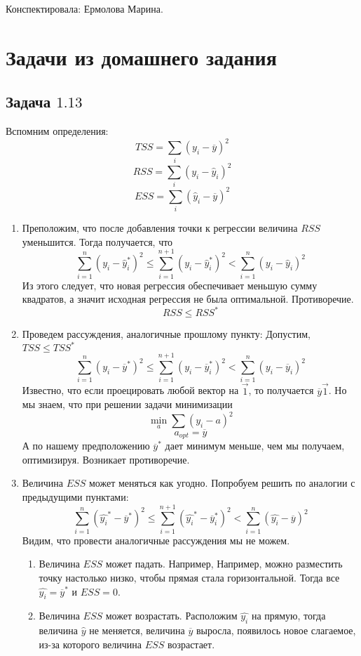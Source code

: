 \documentclass[12pt]{article} %
\theoremstyle{definition} %
\def \hy{\hat{y}}
\begin{document}
Конспектировала: Ермолова Марина.

\section{Задачи из домашнего задания}

\subsection{Задача \href{https://github.com/bdemeshev/metrics_pro/raw/master/metrics_pro.pdf}{$1.13$}}
Вспомним определения:
\[
TSS = \sum_i (y_i - \overline{y})^2
\]
\[
RSS = \sum_i (y_i - \hy_i)^2
\]
\[
ESS = \sum_i (\hy_i - \overline{y})^2
\]
\begin{enumerate}
\item
Преположим, что после добавления точки к регрессии величина $RSS$ уменьшится. Тогда получается, что \[\sum_{i=1}^n (y_i - \hy_i^*)^2 \leq \sum_{i=1}^{n+1} (y_i - \hy_i^*)^2 < \sum_{i=1}^{n} (y_i - \hy_i)^2\] Из этого следует, что новая регрессия обеспечивает меньшую сумму квадратов, а значит исходная регрессия не была оптимальной. Противоречие.
\[
RSS \leq RSS^*
\]
\item
Проведем рассуждения, аналогичные прошлому пункту:
Допустим, $TSS \leq TSS^*$
\[\sum_{i=1}^n (y_i - \overline{y}^*)^2 \leq \sum_{i=1}^{n+1} (y_i - \overline{y}_i^*)^2 < \sum_{i=1}^{n} (y_i - \overline{y}_i)^2
\]
Известно, что если проецировать любой вектор на $\vec{1}$, то получается $\overline{y}\vec{1}$. Но мы знаем, что при решении задачи минимизации
\\
\[\min_{a} \sum(y_i-a)^2\]
\[a_{opt}=\overline{y}\]
А по нашему предположению $\overline{y}^*$ дает минимум меньше, чем мы получаем, оптимизируя.
Возникает противоречие.
\item
Величина $ESS$ может меняться как угодно.
Попробуем решить по аналогии с предыдущими пунктами:
\[\sum_{i=1}^n (\hat{y_i}^* - \overline{y}^*)^2 \leq \sum_{i=1}^{n+1} (\hat{y_i}^* - \overline{y}_i^*)^2 < \sum_{i=1}^{n} (\hat{y_i} - \overline{y})^2
\]
Видим, что провести аналогичные рассуждения мы не можем.
\begin{enumerate}
\item Величина $ESS$ может падать. Например,
Например, можно разместить точку настолько низко, чтобы прямая стала горизонтальной. Тогда все $\hat{y_i} = \overline{y}^*$ и $ESS=0$.
\item Величина $ESS$ может возрастать.
Расположим $\hat{y_i}$ на прямую, тогда величина $\hat{y}$ не меняется, величина $\overline{y}$ выросла, появилось новое слагаемое, из-за которого величина $ESS$ возрастает.
\end{enumerate}
\end{enumerate}
\end{document}
